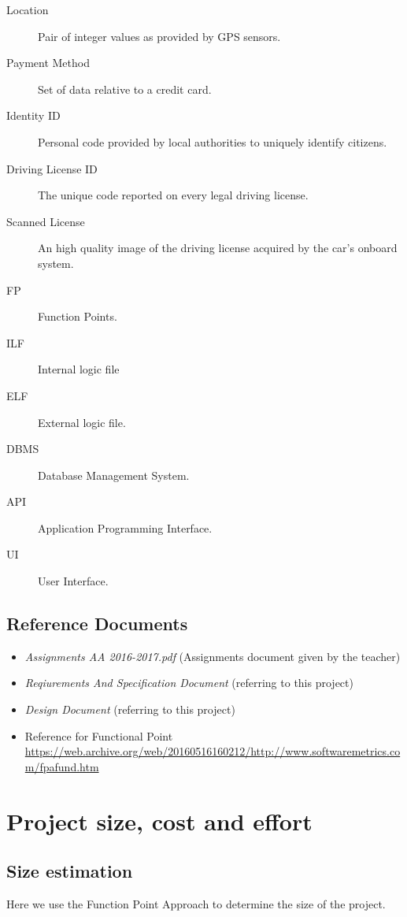 \documentclass[11pt]{article} %
\begin{document}
\begin{description}
	\item[Location] Pair of integer values as provided by GPS sensors.
	\item[Payment Method] Set of data relative to a credit card.
	\item[Identity ID] Personal code provided by local authorities to uniquely identify citizens.
	\item[Driving License ID] The unique code reported on every legal driving license.
	\item[Scanned License] An high quality image of the driving license acquired by the car's onboard system.
	\item[FP] Function Points.
	\item[ILF] Internal logic file
	\item[ELF] External logic file.
	\item[DBMS] Database Management System.
	\item[API] Application Programming Interface.
	\item[UI] User Interface.
  \end{description}

\subsection{Reference Documents}
\begin{itemize}
	\item \textit{Assignments AA 2016-2017.pdf} (Assignments document given by the teacher)
	\item \textit{Reqiurements And Specification Document} (referring to this project)
	\item \textit{Design Document} (referring to this project)
	\item	Reference for Functional Point \url{https://web.archive.org/web/20160516160212/http://www.softwaremetrics.com/fpafund.htm}
  \end{itemize}




\newpage
\section{Project size, cost and effort}

\subsection{Size estimation}

Here we use the Function Point Approach to determine the size of the project.
\end{document}
